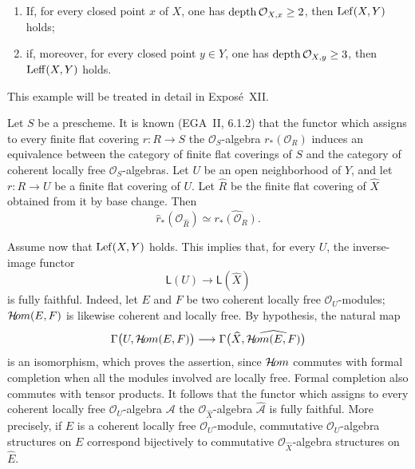 \begin{enumerate}[label=(\roman*),leftmargin=2.5em]
\item If, for every closed point $x$ of $X$, one has
$\operatorname{depth}\mathcal O_{X,x}\geq2$, then $\operatorname{Lef}(X,Y)$ holds;

\item if, moreover, for every closed point $y\in Y$, one has
$\operatorname{depth}\mathcal O_{X,y}\geq3$, then $\operatorname{Leff}(X,Y)$ holds.
\end{enumerate}

\medskip
This example will be treated in detail in Exposé~XII.

\medskip
Let $S$ be a prescheme. It is known (EGA~II, 6.1.2) that the functor which
assigns to every finite flat covering $r\colon R\to S$ the
$\mathcal O_S$-algebra $r_*(\mathcal O_R)$ induces an equivalence between
the category of finite flat coverings of $S$ and the category of coherent
locally free $\mathcal O_S$-algebras.
Let $U$ be an open neighborhood of $Y$, and let $r\colon R\to U$ be a
finite flat covering of $U$. Let $\widehat R$ be the finite flat covering of
$\widehat X$ obtained from it by base change. Then
\[
  \widehat r_*(\mathcal O_{\widehat R})
  \simeq \widehat{r_*(\mathcal O_R)}.
\]

Assume now that $\operatorname{Lef}(X,Y)$ holds. This implies that, for every $U$, the
inverse-image functor
\[
  \mathsf L(U)\longrightarrow\mathsf L(\widehat X)
\]
is fully faithful. Indeed, let $E$ and $F$ be two coherent locally free
$\mathcal O_U$-modules; $\mathcal H\!om(E,F)$ is likewise coherent and locally free.
By hypothesis, the natural map
\[
  \Gamma\bigl(U,\mathcal H\!om(E,F)\bigr)
  \longrightarrow
  \Gamma\bigl(\widehat X,\widehat{\mathcal H\!om(E,F)}\bigr)
\]
is an isomorphism, which proves the assertion, since $\mathcal H\!om$ commutes with
formal completion when all the modules involved are locally free. Formal
completion also commutes with tensor products. It follows that the functor
which assigns to every coherent locally free $\mathcal O_U$-algebra
$\mathcal A$ the $\mathcal O_{\widehat X}$-algebra $\widehat{\mathcal A}$
is fully faithful. More precisely, if $E$ is a coherent locally free
$\mathcal O_U$-module, commutative $\mathcal O_U$-algebra structures on $E$
correspond bijectively to commutative $\mathcal O_{\widehat X}$-algebra
structures on $\widehat E$.

